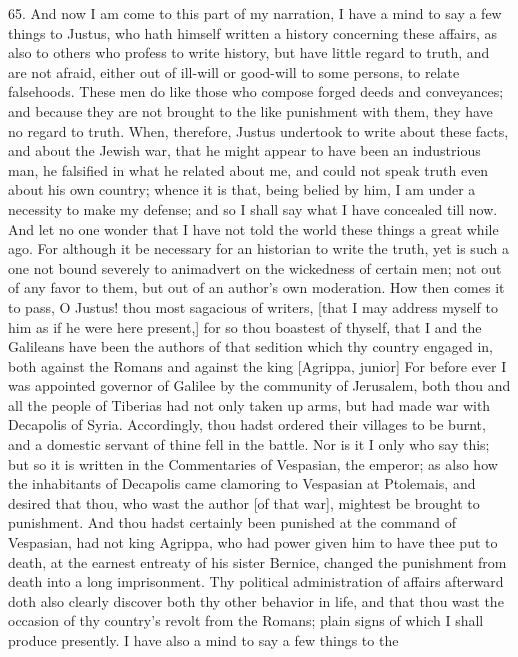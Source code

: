 65. And now I am come to this part of my narration, I have a mind to say a
few things to Justus, who hath himself written a history concerning these
affairs, as also to others who profess to write history, but have little
regard to truth, and are not afraid, either out of ill-will or good-will
to some persons, to relate falsehoods. These men do like those who compose
forged deeds and conveyances; and because they are not brought to the like
punishment with them, they have no regard to truth. When, therefore,
Justus undertook to write about these facts, and about the Jewish war,
that he might appear to have been an industrious man, he falsified in what
he related about me, and could not speak truth even about his own country;
whence it is that, being belied by him, I am under a necessity to make my
defense; and so I shall say what I have concealed till now. And let no one
wonder that I have not told the world these things a great while ago. For
although it be necessary for an historian to write the truth, yet is such
a one not bound severely to animadvert on the wickedness of certain men;
not out of any favor to them, but out of an author's own moderation. How
then comes it to pass, O Justus! thou most sagacious of writers, [that I
may address myself to him as if he were here present,] for so thou
boastest of thyself, that I and the Galileans have been the authors of
that sedition which thy country engaged in, both against the Romans and
against the king [Agrippa, junior] For before ever I was appointed
governor of Galilee by the community of Jerusalem, both thou and all the
people of Tiberias had not only taken up arms, but had made war with
Decapolis of Syria. Accordingly, thou hadst ordered their villages to be
burnt, and a domestic servant of thine fell in the battle. Nor is it I
only who say this; but so it is written in the Commentaries of Vespasian,
the emperor; as also how the inhabitants of Decapolis came clamoring to
Vespasian at Ptolemais, and desired that thou, who wast the author [of
that war], mightest be brought to punishment. And thou hadst certainly
been punished at the command of Vespasian, had not king Agrippa, who had
power given him to have thee put to death, at the earnest entreaty of his
sister Bernice, changed the punishment from death into a long
imprisonment. Thy political administration of affairs afterward doth also
clearly discover both thy other behavior in life, and that thou wast the
occasion of thy country's revolt from the Romans; plain signs of which I
shall produce presently. I have also a mind to say a few things to the
